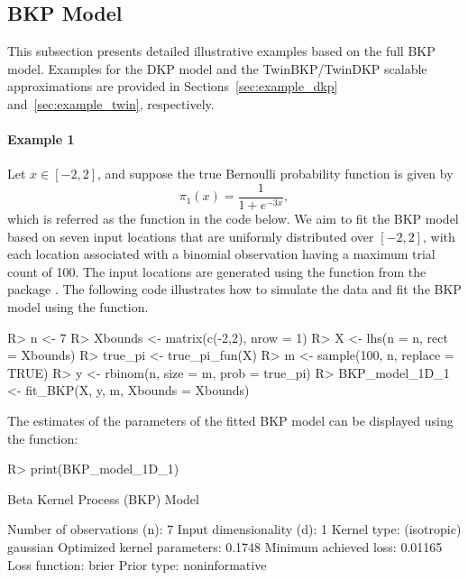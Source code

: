\documentclass[article, shortnames]{jss}
\newcommand{\fct}[1]{\code{#1()}}
\begin{document}
\subsection{BKP Model}\label{sec:example_bkp}

This subsection presents detailed illustrative examples based on the full BKP model. 
Examples for the DKP model and the TwinBKP/TwinDKP scalable approximations are provided in Sections~\ref{sec:example_dkp} and~\ref{sec:example_twin}, respectively.

\paragraph{Example 1} Let $x\in[-2,2]$, and suppose the true Bernoulli probability function is given by
\begin{equation}\label{eq:bkp-1d-generate-function-1}
	\pi_{1}(x) = \frac{1}{1+e^{-3x}},
\end{equation}
which is referred as the function  in the code below.
We aim to fit the BKP model based on seven input locations that are uniformly distributed over $[-2,2]$, with each location associated with a binomial observation having a maximum trial count of 100. The input locations are generated using the \fct{lhs} function from the  package  \citep{Gramacy2010tgp2}. The following  code illustrates how to simulate the data and fit the BKP model using the \fct{fit\_BKP} function.

\begin{CodeChunk}
\begin{CodeInput}    
R> n <- 7
R> Xbounds <- matrix(c(-2,2), nrow = 1) 
R> X <- lhs(n = n, rect = Xbounds) 
R> true_pi <- true_pi_fun(X) 
R> m <- sample(100, n, replace = TRUE)
R> y <- rbinom(n, size = m, prob = true_pi) 
R> BKP_model_1D_1 <- fit_BKP(X, y, m, Xbounds = Xbounds)
\end{CodeInput}
\end{CodeChunk}

The estimates of the parameters of the fitted BKP model can be displayed using the \fct{print} function:

\begin{CodeChunk}
\begin{CodeInput} 
R> print(BKP_model_1D_1)
\end{CodeInput}
\begin{CodeOutput}  
       Beta Kernel Process (BKP) Model    

Number of observations (n):  7
Input dimensionality (d):    1
Kernel type:                 (isotropic) gaussian
Optimized kernel parameters: 0.1748
Minimum achieved loss:       0.01165
Loss function:               brier
Prior type:                  noninformative
\end{CodeOutput}
\end{CodeChunk}
\end{document}
